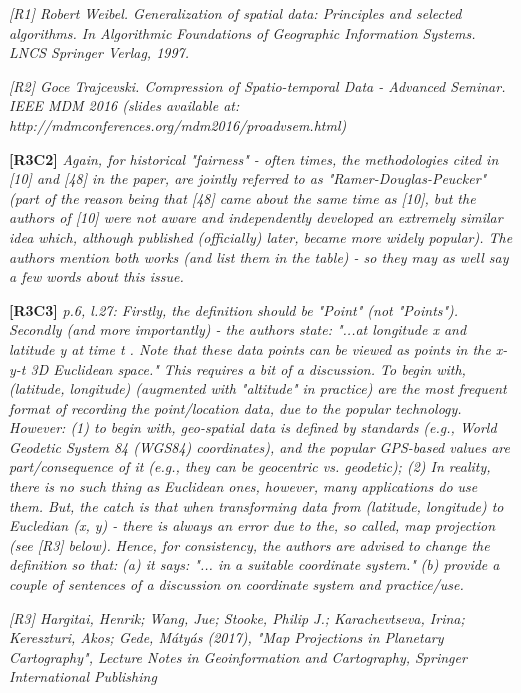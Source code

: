 \documentclass{letter}
\begin{document}
\emph{[R1] Robert Weibel. Generalization of spatial data: Principles and selected algorithms. In Algorithmic Foundations of Geographic Information Systems. LNCS Springer Verlag, 1997.}


\emph{[R2] Goce Trajcevski. Compression of Spatio-temporal Data - Advanced Seminar. IEEE MDM 2016 (slides available at: http://mdmconferences.org/mdm2016/proadvsem.html)}







\textbf{[R3C2]} \emph{Again, for historical "fairness" - often times, the methodologies cited in [10] and [48] in the paper, are jointly referred to as "Ramer-Douglas-Peucker" (part of the reason being that [48] came about the same time as [10], but the authors of [10] were not aware and independently developed an extremely similar idea which, although published (officially) later, became more widely popular). The authors mention both works (and list them in the table) - so they may as well say a few words about this issue.}






\textbf{[R3C3]} \emph{p.6, l.27: Firstly, the definition should be "Point" (not "Points"). Secondly (and more importantly) - the authors state: "...at longitude x and latitude y at time t . Note that these data points can be viewed as points in the x-y-t 3D Euclidean space." This requires a bit of a discussion. To begin with, (latitude, longitude) (augmented with "altitude" in practice) are the most frequent format of recording the point/location data, due to the popular technology. However: (1) to begin with, geo-spatial data is defined by standards (e.g., World Geodetic System 84 (WGS84) coordinates), and the popular GPS-based values are part/consequence of it (e.g., they can be geocentric vs. geodetic); (2) In reality, there is no such thing as Euclidean ones, however, many applications do use them. But, the catch is that when transforming data from (latitude, longitude) to Eucledian (x, y) - there is always an error due to the, so called, map projection (see [R3] below).}
%	
\emph{Hence, for consistency, the authors are advised to change the definition so that:}
%	
\emph{(a) it says: "... in a suitable coordinate system."}
%	
\emph{(b) provide a couple of sentences of a discussion on coordinate system and practice/use.}

\emph{[R3] Hargitai, Henrik; Wang, Jue; Stooke, Philip J.; Karachevtseva, Irina; Kereszturi, Akos; Gede, Mátyás (2017), "Map Projections in Planetary Cartography", Lecture Notes in Geoinformation and Cartography, Springer International Publishing}
\end{document}
